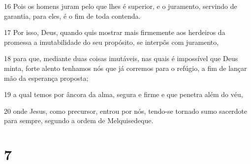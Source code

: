 \par 16 Pois os homens juram pelo que lhes é superior, e o juramento, servindo de garantia, para eles, é o fim de toda contenda.
\par 17 Por isso, Deus, quando quis mostrar mais firmemente aos herdeiros da promessa a imutabilidade do seu propósito, se interpôs com juramento,
\par 18 para que, mediante duas coisas imutáveis, nas quais é impossível que Deus minta, forte alento tenhamos nós que já corremos para o refúgio, a fim de lançar mão da esperança proposta;
\par 19 a qual temos por âncora da alma, segura e firme e que penetra além do véu,
\par 20 onde Jesus, como precursor, entrou por nós, tendo-se tornado sumo sacerdote para sempre, segundo a ordem de Melquisedeque.

\chapter{7}

